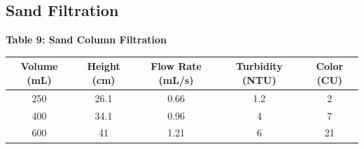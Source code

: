 \subsection{Sand Filtration}
\begin{center}


{\large{\bf Table 9: Sand Column Filtration\\}}
\vspace{3 mm}
\begin{tabular}{|c c c c c|}
    \hline
    \textbf{Volume (mL)} & \textbf{Height (cm)} & \textbf{Flow Rate (mL/s)} & \textbf{Turbidity (NTU)} & \textbf{Color (CU)} \\\hline
    250 & 26.1 & 0.66 & 1.2 & 2 \\
    400 & 34.1 & 0.96 & 4 & 7 \\
    600 & 41 & 1.21 & 6 & 21 \\\hline
\end{tabular}
\vspace{6mm}


\pgfplotsset{width=8cm}


\end{center}
